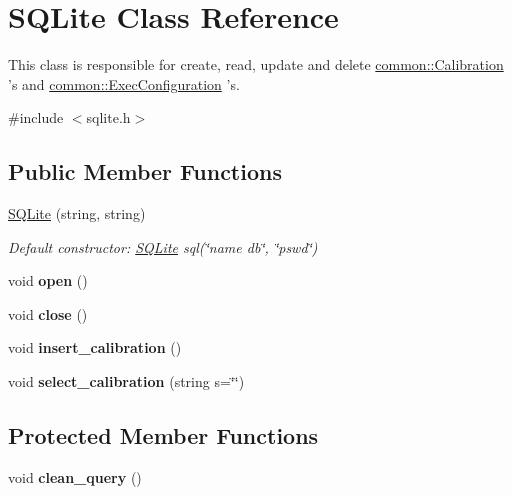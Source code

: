 \hypertarget{classSQLite}{\section{S\-Q\-Lite Class Reference}
\label{classSQLite}
}


This class is responsible for create, read, update and delete \hyperlink{structcommon_1_1Calibration}{common\-::\-Calibration} 's and \hyperlink{structcommon_1_1ExecConfiguration}{common\-::\-Exec\-Configuration} 's.  




{\ttfamily \#include $<$sqlite.\-h$>$}

\subsection*{Public Member Functions}
\begin{DoxyCompactItemize}
\item 
\hypertarget{classSQLite_aec016ee26d918bb715383b7578118166}{\hyperlink{classSQLite_aec016ee26d918bb715383b7578118166}{S\-Q\-Lite} (string, string)}\label{classSQLite_aec016ee26d918bb715383b7578118166}

\begin{DoxyCompactList}\small\item\em Default constructor\-: \hyperlink{classSQLite}{S\-Q\-Lite} sql(\char`\"{}name db\char`\"{}, \char`\"{}pswd\char`\"{}) \end{DoxyCompactList}\item 
\hypertarget{classSQLite_a2ba6d61d356aac7b2a0d7323ba997279}{void {\bfseries open} ()}\label{classSQLite_a2ba6d61d356aac7b2a0d7323ba997279}

\item 
\hypertarget{classSQLite_aac5338faf7580f6adb3560c91d58b54a}{void {\bfseries close} ()}\label{classSQLite_aac5338faf7580f6adb3560c91d58b54a}

\item 
\hypertarget{classSQLite_ae145e41fed72678f0e2900ec093ad323}{void {\bfseries insert\-\_\-calibration} ()}\label{classSQLite_ae145e41fed72678f0e2900ec093ad323}

\item 
\hypertarget{classSQLite_aeb720971a449cc51d124251fa995cb5c}{void {\bfseries select\-\_\-calibration} (string s=\char`\"{}\char`\"{})}\label{classSQLite_aeb720971a449cc51d124251fa995cb5c}

\end{DoxyCompactItemize}
\subsection*{Protected Member Functions}
\begin{DoxyCompactItemize}
\item 
\hypertarget{classSQLite_a3b7e7d4f78e02266bd7bb9b6eb4828ee}{void {\bfseries clean\-\_\-query} ()}\label{classSQLite_a3b7e7d4f78e02266bd7bb9b6eb4828ee}

\end{DoxyCompactItemize}
